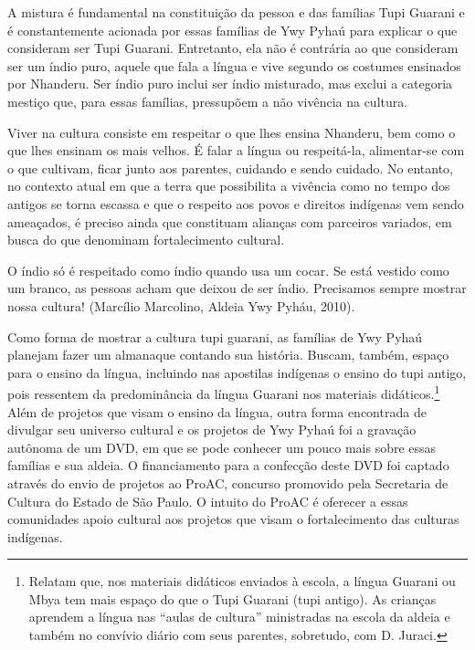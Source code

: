 \documentclass{article}
\begin{document}
A mistura \'e fundamental na constitui\c{c}\~ao da pessoa e das
fam\'ilias Tupi Guarani e \'e constantemente acionada por essas
fam\'ilias de Ywy Pyha\'u para explicar o que consideram ser Tupi
Guarani. Entretanto, ela n\~ao \'e contr\'aria ao que consideram ser um
\'indio puro, aquele que fala a l\'ingua e vive segundo os costumes
ensinados por Nhanderu. Ser \'indio puro inclui ser \'indio misturado,
mas exclui a categoria mesti\c{c}o que, para essas fam\'ilias,
pressup\~oem a n\~ao viv\^encia na cultura.

Viver na cultura consiste em respeitar o que lhes ensina Nhanderu, bem
como o que lhes ensinam os mais velhos. \'E falar a l\'ingua ou
respeit\'a-la, alimentar-se com o que cultivam, ficar junto aos
parentes, cuidando e sendo cuidado. No entanto, no contexto atual em
que a terra que possibilita a viv\^encia como no tempo dos antigos se
torna escassa e que o respeito aos povos e direitos ind\'igenas vem
sendo amea\c{c}ados, \'e preciso ainda que constituam alian\c{c}as com
parceiros variados, em busca do que denominam fortalecimento cultural. 


O \'indio s\'o \'e respeitado como \'indio quando usa um cocar. Se
est\'a vestido como um branco, as pessoas acham que deixou de ser
\'indio. Precisamos sempre mostrar nossa cultura! (Marc\'ilio
Marcolino, Aldeia Ywy Pyh\'au, 2010).

Como forma de mostrar a cultura tupi guarani, as fam\'ilias de Ywy
Pyha\'u planejam fazer um almanaque contando sua hist\'oria. Buscam,
tamb\'em, espa\c{c}o para o ensino da l\'ingua, incluindo nas apostilas
ind\'igenas o ensino do tupi antigo, pois ressentem da predomin\^ancia
da l\'ingua Guarani nos materiais did\'aticos.\footnote{ Relatam que,
nos materiais did\'aticos enviados \`a escola, a l\'ingua Guarani ou
Mbya tem mais espa\c{c}o do que o Tupi Guarani (tupi antigo). As
crian\c{c}as aprendem a l\'ingua nas {\textquotedblleft}aulas de
cultura{\textquotedblright} ministradas na escola da aldeia e tamb\'em
no conv\'ivio di\'ario com seus parentes, sobretudo, com D. Juraci.}
Al\'em de projetos que visam o ensino da l\'ingua, outra forma
encontrada de divulgar seu universo cultural e os projetos de Ywy
Pyha\'u foi a grava\c{c}\~ao aut\^onoma de um DVD, em que se pode
conhecer um pouco mais sobre essas fam\'ilias e sua aldeia. O
financiamento para a confec\c{c}\~ao deste DVD foi captado atrav\'es do
envio de projetos ao ProAC, concurso promovido pela Secretaria de
Cultura do Estado de S\~ao Paulo. O intuito do ProAC \'e oferecer a
essas comunidades apoio cultural aos projetos que visam o
fortalecimento das culturas ind\'igenas. 
\end{document}
